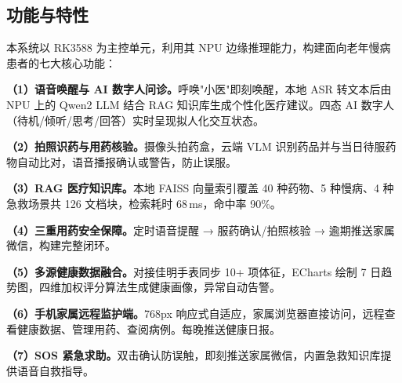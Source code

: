\documentclass[12pt, a4paper]{ctexart}
\begin{document}
\subsection{功能与特性}

本系统以 RK3588 为主控单元，利用其 NPU 边缘推理能力，构建面向老年慢病患者的七大核心功能：

\textbf{（1）语音唤醒与 AI 数字人问诊。}呼唤"小医"即刻唤醒，本地 ASR 转文本后由 NPU 上的 Qwen2 LLM 结合 RAG 知识库生成个性化医疗建议。四态 AI 数字人（待机/倾听/思考/回答）实时呈现拟人化交互状态。

\textbf{（2）拍照识药与用药核验。}摄像头拍药盒，云端 VLM 识别药品并与当日待服药物自动比对，语音播报确认或警告，防止误服。

\textbf{（3）RAG 医疗知识库。}本地 FAISS 向量索引覆盖 40 种药物、5 种慢病、4 种急救场景共 126 文档块，检索耗时 68\,ms，命中率 90\%。

\textbf{（4）三重用药安全保障。}定时语音提醒 → 服药确认/拍照核验 → 逾期推送家属微信，构建完整闭环。

\textbf{（5）多源健康数据融合。}对接佳明手表同步 10+ 项体征，ECharts 绘制 7 日趋势图，四维加权评分算法生成健康画像，异常自动告警。

\textbf{（6）手机家属远程监护端。}768px 响应式自适应，家属浏览器直接访问，远程查看健康数据、管理用药、查阅病例。每晚推送健康日报。

\textbf{（7）SOS 紧急求助。}双击确认防误触，即刻推送家属微信，内置急救知识库提供语音自救指导。
\end{document}
